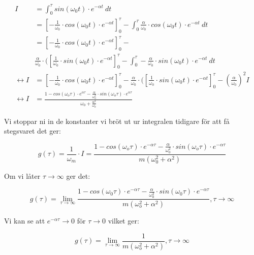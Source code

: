 \documentclass[10pt,a4paper]{article}
\begin{document}
\begin{equation}
\begin{split} 
I & = \int_0^\tau sin(\omega_0 t)\cdot e^{-\alpha t} \  dt  \\
& = [-\frac{1}{\omega_0} \cdot cos(\omega_0 t) \cdot e^{-\alpha t}]_0^\tau - \int_0^\tau \frac{\alpha}{\omega_0} \cdot cos(\omega_0 t) \cdot e^{-\alpha t}  \ dt \\
& = [-\frac{1}{\omega_0} \cdot cos(\omega_0 t) \cdot e^{-\alpha t}]_0^\tau - \\
& \frac{\alpha}{\omega_0} \cdot ([\frac{1}{\omega_0} \cdot sin(\omega_0 t) \cdot e^{-\alpha t}]_0^\tau - \int_0^\tau -\frac{\alpha}{\omega_0} \cdot sin(\omega_0  t)\cdot e^{-\alpha t}  \ dt \\
\leftrightarrow
I & = [-\frac{1}{\omega_0} \cdot cos(\omega_0 t) \cdot e^{-\alpha t}]_0^\tau - \frac{\alpha}{\omega_0} \cdot ([\frac{1}{\omega_0} \cdot sin(\omega_0 t) \cdot e^{-\alpha t}]_0^\tau - (\frac{\alpha}{\omega_0})^2 I \\
\leftrightarrow I & = \frac{1-cos(\omega_o \tau) \cdot e^{\alpha \tau} - \frac{\alpha}{\omega_0^2} \cdot sin(\omega_o \tau) \cdot e^{\alpha \tau}}{\omega_0 + \frac{\alpha^2}{\omega_0}}
\end{split}
\end{equation}

Vi stoppar ni in de konstanter vi bröt ut ur integralen tidigare för att få stegsvaret det ger:

\begin{equation}
g(\tau)= \frac{1}{\omega_ m} \cdot I = \frac{1-cos(\omega_o \tau) \cdot e^{-\alpha  \tau} - \frac{\alpha}{\omega_0^2} \cdot sin(\omega_o \tau) \cdot e^{-\alpha \tau}}{m (\omega_0^2 + \alpha^2)}
\end{equation}

Om vi låter $\tau \to \infty$ ger det:

\begin{equation}
g(\tau) = \lim_{\tau \to \infty} \frac{1 - cos(\omega_0 \tau) \cdot e^{-\alpha \tau}
- \frac{\alpha}{\omega_0^2} \cdot sin(\omega_0  \tau) \cdot e^{-\alpha  \tau}}{m  (\omega_o^2 +\alpha^2)}, \tau \to \infty
\end{equation}

Vi kan se att $e^{-\alpha  \tau} \to 0$ för $\tau \to 0$ vilket ger:

\begin{equation}
g(\tau) = \lim_{\tau \to \infty} \frac{1}{m  (\omega_o^2 +\alpha^2)} , \tau \to \infty
\end{equation}
\end{document}
